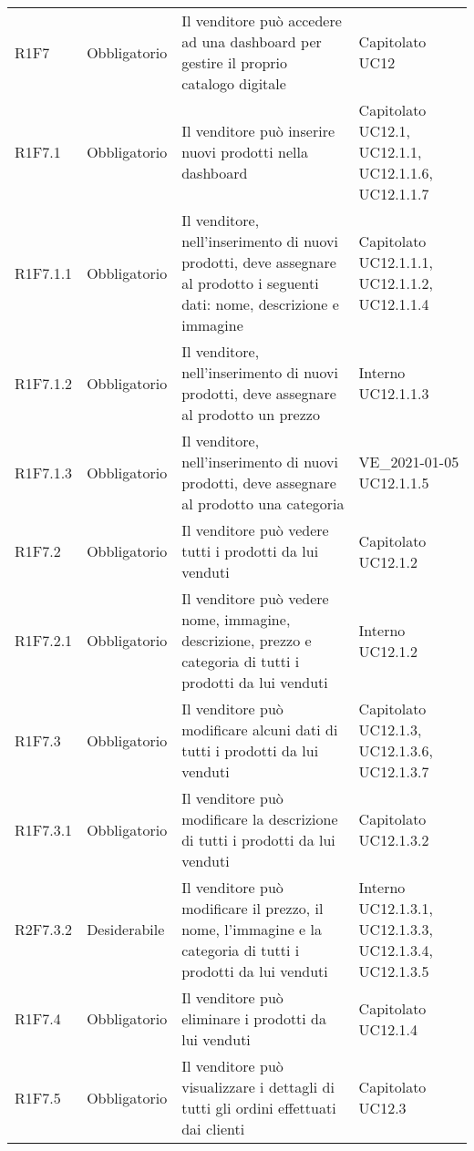 {\begin{longtable}{C{2.5cm} C{2.8cm} C{6.7cm} C{2.5cm}}
R1F7 & Obbligatorio & Il venditore può accedere ad una dashboard per gestire il proprio catalogo digitale & Capitolato \newline UC12\\
R1F7.1 & Obbligatorio & Il venditore può inserire nuovi prodotti nella dashboard & Capitolato \newline UC12.1, UC12.1.1, UC12.1.1.6, UC12.1.1.7\\
R1F7.1.1 & Obbligatorio & Il venditore, nell'inserimento di nuovi prodotti, deve assegnare al prodotto i seguenti dati: nome, descrizione e immagine & Capitolato \newline UC12.1.1.1, UC12.1.1.2, UC12.1.1.4\\
R1F7.1.2 & Obbligatorio & Il venditore, nell'inserimento di nuovi prodotti, deve assegnare al prodotto un prezzo & Interno \newline UC12.1.1.3\\ 
R1F7.1.3 & Obbligatorio & Il venditore, nell'inserimento di nuovi prodotti, deve assegnare al prodotto una categoria & VE\_2021-01-05 \newline UC12.1.1.5\\ 
R1F7.2 & Obbligatorio & Il venditore può vedere tutti i prodotti da lui venduti & Capitolato \newline UC12.1.2 \\
R1F7.2.1 & Obbligatorio & Il venditore può vedere nome, immagine, descrizione, prezzo e categoria di tutti i prodotti da lui venduti & Interno \newline UC12.1.2\\
R1F7.3 & Obbligatorio & Il venditore può modificare alcuni dati di tutti i prodotti da lui venduti & Capitolato \newline UC12.1.3, UC12.1.3.6, UC12.1.3.7 \\
R1F7.3.1 & Obbligatorio & Il venditore può modificare la descrizione di tutti i prodotti da lui venduti & Capitolato \newline UC12.1.3.2\\
R2F7.3.2 & Desiderabile & Il venditore può modificare il prezzo, il nome, l'immagine e la categoria di tutti i prodotti da lui venduti & Interno \newline UC12.1.3.1, UC12.1.3.3, UC12.1.3.4, UC12.1.3.5\\
R1F7.4 & Obbligatorio & Il venditore può eliminare i prodotti da lui venduti & Capitolato \newline UC12.1.4 \\
R1F7.5 & Obbligatorio & Il venditore può visualizzare i dettagli di tutti gli ordini effettuati dai clienti & Capitolato \newline UC12.3\\

\end{longtable}}
